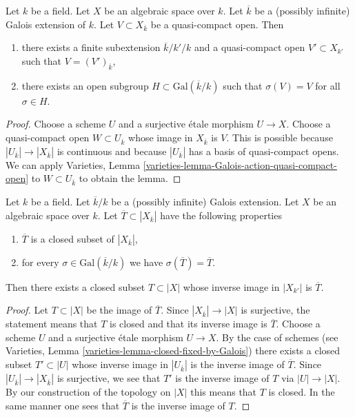 \begin{lemma}
\label{lemma-Galois-action-quasi-compact-open}
Let $k$ be a field. Let $X$ be an algebraic space over $k$.
Let $\overline{k}$ be a (possibly infinite) Galois extension of $k$.
Let $V \subset X_{\overline{k}}$ be a quasi-compact open.
Then
\begin{enumerate}
\item there exists a finite subextension $\overline{k}/k'/k$
and a quasi-compact open $V' \subset X_{k'}$ such that
$V = (V')_{\overline{k}}$,
\item there exists an open subgroup $H \subset \text{Gal}(\overline{k}/k)$
such that $\sigma(V) = V$ for all $\sigma \in H$.
\end{enumerate}
\end{lemma}

\begin{proof}
Choose a scheme $U$ and a surjective \'etale morphism $U \to X$.
Choose a quasi-compact open $W \subset U_{\overline{k}}$ whose
image in $X_{\overline{k}}$ is $V$. This is possible because
$|U_{\overline{k}}| \to |X_{\overline{k}}|$ is continuous and because
$|U_{\overline{k}}|$ has a basis of quasi-compact opens. We can apply
Varieties, Lemma
\ref{varieties-lemma-Galois-action-quasi-compact-open}
to $W \subset U_{\overline{k}}$ to obtain the lemma.
\end{proof}

\begin{lemma}
\label{lemma-closed-fixed-by-Galois}
Let $k$ be a field. Let $\overline{k}/k$ be a (possibly infinite)
Galois extension. Let $X$ be an algebraic space over $k$. Let
$\overline{T} \subset |X_{\overline{k}}|$ have the following properties
\begin{enumerate}
\item $\overline{T}$ is a closed subset of $|X_{\overline{k}}|$,
\item for every $\sigma \in \text{Gal}(\overline{k}/k)$
we have $\sigma(\overline{T}) = \overline{T}$.
\end{enumerate}
Then there exists a closed subset $T \subset |X|$ whose inverse image
in $|X_{k'}|$ is $\overline{T}$.
\end{lemma}

\begin{proof}
Let $T \subset |X|$ be the image of $\overline{T}$.
Since $|X_{\overline{k}}| \to |X|$ is surjective, the statement means
that $T$ is closed and that its inverse image is $\overline{T}$.
Choose a scheme $U$ and a surjective \'etale morphism $U \to X$.
By the case of schemes
(see Varieties, Lemma \ref{varieties-lemma-closed-fixed-by-Galois})
there exists a closed subset $T' \subset |U|$ whose inverse image
in $|U_{\overline{k}}|$ is the inverse image of $\overline{T}$.
Since $|U_{\overline{k}}| \to |X_{\overline{k}}|$ is surjective,
we see that $T'$ is the inverse image of $T$ via $|U| \to |X|$.
By our construction of the topology on $|X|$ this means that $T$ is
closed. In the same manner one sees that $\overline{T}$ is the inverse
image of $T$.
\end{proof}

